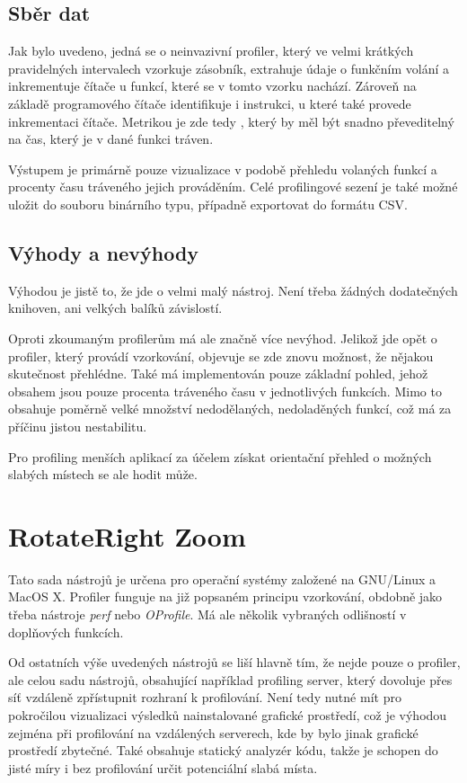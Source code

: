 \documentclass[czech,BP]{thesiskiv}
\begin{document}
\subsection*{Sběr dat}

Jak bylo uvedeno, jedná se o neinvazivní profiler, který ve velmi krátkých pravidelných intervalech vzorkuje zásobník, extrahuje údaje o funkčním volání a inkrementuje čítače u funkcí, které se v tomto vzorku nachází. Zároveň na základě programového čítače identifikuje i instrukci, u které také provede inkrementaci čítače. Metrikou je zde tedy , který by měl být snadno převeditelný na čas, který je v dané funkci tráven.

Výstupem je primárně pouze vizualizace v podobě přehledu volaných funkcí a procenty času tráveného jejich prováděním. Celé profilingové sezení je také možné uložit do souboru binárního typu, případně exportovat do formátu CSV.

\subsection*{Výhody a nevýhody}

Výhodou je jistě to, že jde o velmi malý nástroj. Není třeba žádných dodatečných knihoven, ani velkých balíků závislostí.

Oproti zkoumaným profilerům má ale značně více nevýhod. Jelikož jde opět o profiler, který provádí vzorkování, objevuje se zde znovu možnost, že nějakou skutečnost přehlédne. Také má implementován pouze základní pohled, jehož obsahem jsou pouze procenta tráveného času v jednotlivých funkcích. Mimo to obsahuje poměrně velké množství nedodělaných, nedoladěných funkcí, což má za příčinu jistou nestabilitu.

Pro profiling menších aplikací za účelem získat orientační přehled o možných slabých místech se ale hodit může.





\section{RotateRight Zoom}

Tato sada nástrojů je určena pro operační systémy založené na GNU/Linux a MacOS X. Profiler funguje na již popsaném principu vzorkování, obdobně jako třeba nástroje \emph{perf} nebo \emph{OProfile}. Má ale několik vybraných odlišností v doplňových funkcích.

Od ostatních výše uvedených nástrojů se liší hlavně tím, že nejde pouze o profiler, ale celou sadu nástrojů, obsahující například profiling server, který dovoluje přes síť vzdáleně zpřístupnit rozhraní k profilování. Není tedy nutné mít pro pokročilou vizualizaci výsledků nainstalované grafické prostředí, což je výhodou zejména při profilování na vzdálených serverech, kde by bylo jinak grafické prostředí zbytečné. Také obsahuje statický analyzér kódu, takže je schopen do jisté míry i bez profilování určit potenciální slabá místa.
\end{document}

